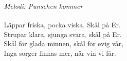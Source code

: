 {\footnotesize\textit{Melodi: Punschen kommer}}\\
\\
Läppar friska, pocka viska. Skål på Er.\\
Strupar klara, sjunga svara, skål på Er.\\
Skål för glada minnen, skål för evig vår,\\
Inga sorger finnas mer, när vin vi får.
